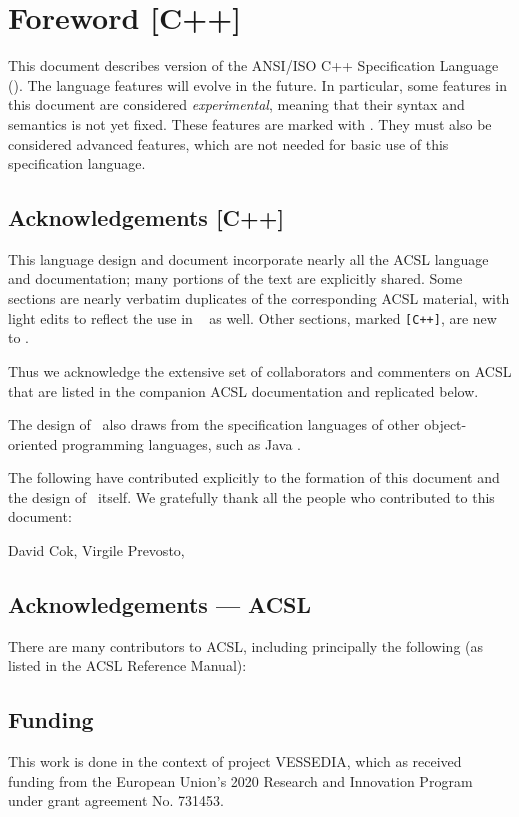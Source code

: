 \chapter*{Foreword [C++]}


This document describes version \version{} of the ANSI/ISO C++ Specification Language (\NAME). 
The language features will evolve in the future. 
In particular, some features in this document
are considered \emph{experimental}, meaning that their syntax and
semantics is not yet fixed.  
These features are marked with
\experimental.  
They must also be considered advanced features,
which are not needed for basic use of this
specification language.

\section*{Acknowledgements [C++]}

This language design and document incorporate nearly all the 
ACSL language and documentation; many portions of the text
are explicitly shared. 
Some sections are nearly verbatim 
duplicates of the corresponding ACSL material, with light edits
to reflect the use in \NAME~ as well. 
Other sections, marked \texttt{[C++]}, are new to \NAME.

Thus we acknowledge the extensive
set of collaborators and commenters on ACSL that are listed
in the companion ACSL documentation and replicated below.

The design of \NAME~also draws from the specification
languages of other object-oriented programming languages, such as Java \cite{leavens00jml}.

The following have contributed explicitly to the formation of
this document and the design of \NAME~itself.
We gratefully thank all the people who contributed to this document:

David Cok,
Virgile Prevosto,

\section*{Acknowledgements --- ACSL}
There are many contributors to ACSL, including principally the following (as listed in the ACSL Reference Manual):


\section*{Funding}
This work is done in the context of project VESSEDIA,
which as received funding from the European Union's 2020
Research and Innovation Program under grant agreement
No. 731453.
